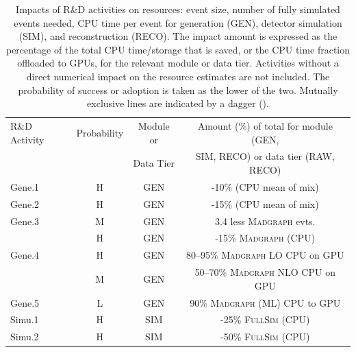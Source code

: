 \begin{table}[tbph]
    \centering
    \caption{Impacts of R\&D activities on resources: event size, number of fully simulated events needed, \gls{CPU} time per event for generation (\gls{GEN}), detector simulation (\gls{SIM}), and reconstruction (\gls{RECO}). The impact amount is expressed as the percentage of the total \gls{CPU} time/storage that is saved, or the \gls{CPU} time fraction offloaded to \glspl{GPU}, for the relevant module or data tier. Activities without a direct numerical impact on the resource estimates are not included. The probability of success or adoption is taken as the lower of the two. Mutually exclusive lines are indicated by a dagger (\dag).}
    \begin{tabular}{|l|c|c|c|}
    \hline
    \rowcolor{tableheader}  R\&D Activity         & Probability & Module or                     & Amount (\%) of total for module (GEN,\\ 
    \rowcolor{tableheader}                        &             & Data Tier                     & SIM, RECO) or data tier (RAW, RECO)\\    
    \hline
    \cellcolor{tablerowheader} Gene.1             &      H      &  GEN                    & -10\% (CPU mean of mix) \\  \hline
    \cellcolor{tablerowheader} Gene.2             &      H      &  GEN                    & -15\% (CPU mean of mix) \\ \hline
    \cellcolor{tablerowheader} Gene.3             &      M      &  GEN                    & 3.4 less \textsc{Madgraph} evts. \\ \hline
    \cellcolor{tablerowheader}                    &      H      &  GEN                    & -15\% \textsc{Madgraph} (CPU)  \\  
    \cellcolor{tablerowheader} Gene.4             &      H      &  \gls{GEN}                    & 80--95\% \textsc{Madgraph} LO CPU on GPU \\ 
     \cellcolor{tablerowheader}                   &      M      &  GEN                    & 50--70\% \textsc{Madgraph} NLO CPU on GPU \\  \hline 
    \cellcolor{tablerowheader} Gene.5             &      L      &  GEN                    &   90\% \textsc{Madgraph} (ML) \gls{CPU} to GPU                     \\ \hline
    \cellcolor{tablerowheader} Simu.1             &      H      &  SIM                    & -25\% \textsc{FullSim} (CPU) \\ \hline
    \cellcolor{tablerowheader} Simu.2             &      H      &  SIM                    & -50\% \textsc{FullSim} (CPU) \\ \hline

\end{tabular}
\end{table}
